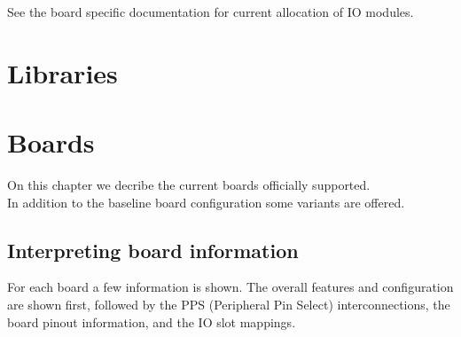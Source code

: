 \documentclass[12pt,a4paper,openany,smallheadings,headinclude,headsepline,final]{scrreprt}
\begin{document}
See the board specific documentation for current allocation of IO modules.










\chapter{Libraries}


\chapter{Boards}
On this chapter we decribe the current boards officially supported. \\
In addition to the baseline board configuration some variants are offered.
\section{Interpreting board information}
For each board a few information is shown. The overall features and configuration are shown first, followed by the PPS (Peripheral 
Pin Select) interconnections, the board pinout information, and the IO slot mappings.\\
\end{document}
